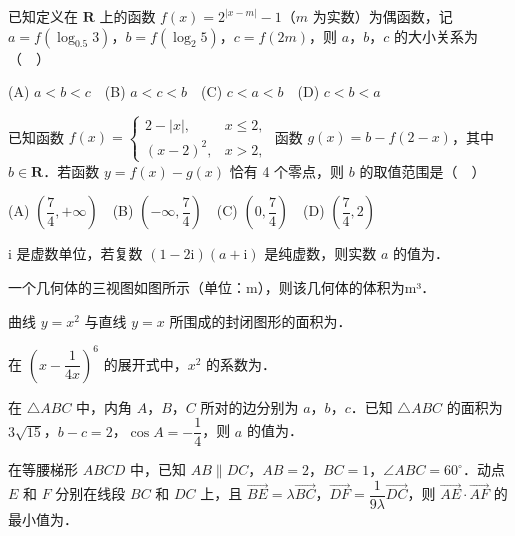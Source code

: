 \begin{question}
已知定义在 \(\mathbf{R}\) 上的函数 \(f(x)=2^{|x-m|}-1\)（\(m\) 为实数）为偶函数，记 \(a=f(\log_{0.5}3)\)，\(b=f(\log_2 5)\)，\(c=f(2m)\)，则 \(a\)，\(b\)，\(c\) 的大小关系为（　）

(A) \(a<b<c\)　(B) \(a<c<b\)　(C) \(c<a<b\)　(D) \(c<b<a\)

\end{question}
\begin{question}
已知函数 $f(x)=\begin{cases}2-|x|,&x\leqslant2,\\(x-2)^2,&x>2,\end{cases}$ 函数 \(g(x)=b-f(2-x)\)，其中 \(b\in\mathbf{R}\)．若函数 \(y=f(x)-g(x)\) 恰有 4 个零点，则 \(b\) 的取值范围是（　）

(A) \(\left(\dfrac{7}{4},+\infty\right)\)　(B) \(\left(-\infty,\dfrac{7}{4}\right)\)　(C) \(\left(0,\dfrac{7}{4}\right)\)　(D) \(\left(\dfrac{7}{4},2\right)\)

\end{question}

\begin{question}
\(\mathrm{i}\) 是虚数单位，若复数 \((1-2\mathrm{i})(a+\mathrm{i})\) 是纯虚数，则实数 \(a\) 的值为\gkblank{}．

\Needspace{0.4\textheight}
\end{question}
\begin{question}
一个几何体的三视图如图所示（单位：m），则该几何体的体积为\gkblank{}m³．
\nopagebreak[4]
\begin{center}\end{center}
\nopagebreak[4]
\end{question}
\begin{question}
曲线 \(y=x^2\) 与直线 \(y=x\) 所围成的封闭图形的面积为\gkblank{}．

\end{question}
\begin{question}
在 \(\left(x-\dfrac{1}{4x}\right)^6\) 的展开式中，\(x^2\) 的系数为\gkblank{}．

\end{question}
\begin{question}
在 \(\triangle ABC\) 中，内角 \(A\)，\(B\)，\(C\) 所对的边分别为 \(a\)，\(b\)，\(c\)．已知 \(\triangle ABC\) 的面积为 \(3\sqrt{15}\)，\(b-c=2\)，\(\cos A=-\dfrac{1}{4}\)，则 \(a\) 的值为\gkblank{}．

\end{question}
\begin{question}
在等腰梯形 \(ABCD\) 中，已知 \(AB\parallel DC\)，\(AB=2\)，\(BC=1\)，\(\angle ABC=60^{\circ}\)．动点 \(E\) 和 \(F\) 分别在线段 \(BC\) 和 \(DC\) 上，且 \(\overrightarrow{BE}=\lambda\overrightarrow{BC}\)，\(\overrightarrow{DF}=\dfrac{1}{9\lambda}\overrightarrow{DC}\)，则 \(\overrightarrow{AE}\cdot\overrightarrow{AF}\) 的最小值为\gkblank{}．

\end{question}


